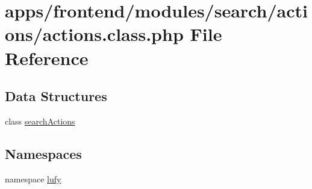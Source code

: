 \hypertarget{frontend_2modules_2search_2actions_2actions_8class_8php}{\section{apps/frontend/modules/search/actions/actions.class.\-php File Reference}
\label{frontend_2modules_2search_2actions_2actions_8class_8php}
}
\subsection*{Data Structures}
\begin{DoxyCompactItemize}
\item 
class \hyperlink{classsearch_actions}{search\-Actions}
\end{DoxyCompactItemize}
\subsection*{Namespaces}
\begin{DoxyCompactItemize}
\item 
namespace \hyperlink{namespacelufy}{lufy}
\end{DoxyCompactItemize}
